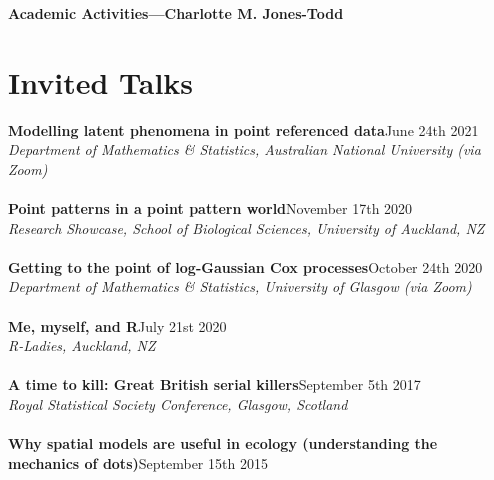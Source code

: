 \documentclass[10pt,letter]{article}
\begin{document}
\LARGE{\textbf{Academic Activities---Charlotte M. Jones-Todd}}

\normalsize

\noindent\makebox[\linewidth]{\rule{\paperwidth}{0.4pt}}

\section*{Invited Talks}
\vspace{1mm}
       {\textbf{Modelling latent phenomena in point referenced data}}\hfill June 24th 2021\\
       {\sl Department of Mathematics \& Statistics, Australian National University (via Zoom)}\\
       \hdashrule[0.5ex]{4cm}{1pt}{1pt}\\
                 {\textbf{Point patterns in a point pattern world}}\hfill November 17th 2020\\
                 {\sl Research Showcase, School of Biological Sciences, University of Auckland, NZ}\\
                 \hdashrule[0.5ex]{4cm}{1pt}{1pt}\\
                           {\textbf{Getting to the point of log-Gaussian Cox processes}}\hfill October 24th 2020\\
                           {\sl Department of Mathematics \& Statistics, University of Glasgow (via Zoom)}\\
                           \hdashrule[0.5ex]{4cm}{1pt}{1pt}\\
                                     {\textbf{Me, myself, and R}}\hfill July 21st 2020\\
                                     {\sl R-Ladies, Auckland, NZ}\\
                                     \hdashrule[0.5ex]{4cm}{1pt}{1pt}\\
                                     \textbf{A time to kill: Great British serial killers}\hfill  September 5th 2017\\
                                            {\sl Royal Statistical Society Conference, Glasgow, Scotland}\\
                                            \hdashrule[0.5ex]{4cm}{1pt}{1pt}\\
                                            \textbf{Why spatial models are useful in ecology (understanding the \\
                                              mechanics of dots)}\hfill September 15th 2015\\
\end{document}

